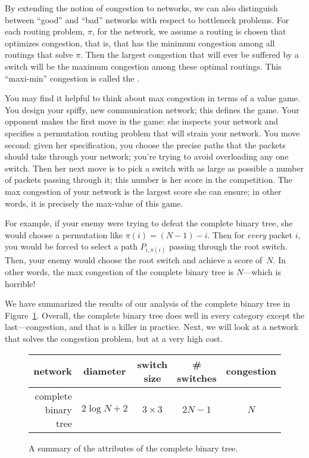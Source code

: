 By extending the notion of congestion to networks, we can also distinguish
between ``good'' and ``bad'' networks with respect to bottleneck problems.
For each routing problem, $\pi$, for the network, we assume a routing is
chosen that optimizes congestion, that is, that has the minimum congestion
among all routings that solve $\pi$.  Then the largest congestion that
will ever be suffered by a switch will be the maximum congestion among
these optimal routings.  This ``maxi-min'' congestion is called the
.

You may find it helpful to think about max congestion in terms of a
value game.  You design your spiffy, new communication network; this
defines the game.  Your opponent makes the first move in the game: she
inspects your network and specifies a permutation routing problem that
will strain your network.  You move second: given her specification,
you choose the precise paths that the packets should take through your
network; you're trying to avoid overloading any one switch.  Then her
next move is to pick a switch with as large as possible a number of
packets passing through it; this number is her score in the
competition.  The max congestion of your network is the largest score
she can ensure; in other words, it is precisely the max-value of this
game.

For example, if your enemy were trying to defeat the complete binary
tree, she would choose a permutation like $\pi(i) = (N - 1) - i$.
Then for \emph{every} packet $i$, you would be forced to select a path
$P_{i, \pi(i)}$ passing through the root switch.  Then, your enemy
would choose the root switch and achieve a score of~$N$.  In other
words, the max congestion of the complete binary tree is $N$---which
is horrible!

We have summarized the results of our analysis of the complete binary
tree in Figure~\ref{fig:6EK}.  Overall, the complete binary tree does
well in every category except the last---congestion, and that is a
killer in practice.  Next, we will look at a network that solves the
congestion problem, but at a very high cost.

\begin{figure}

\begin{tabular}{r|c|c|c|c}
\textbf{network} &
\textbf{diameter} &
\textbf{switch size} &
\textbf{\# switches} &
\textbf{congestion} \\ \hline
complete binary tree & $2 \log N + 2$ & $3 \times 3$ & $2N - 1$ & $N$
\end{tabular}

\caption{A summary of the attributes of the complete binary tree.}

\label{fig:6EK}

\end{figure}

